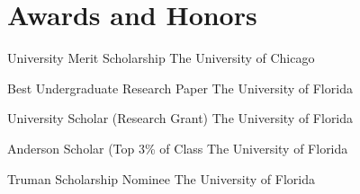 \documentclass[fontsize=8pt]{ChaseCV}
\begin{document}
\section{Awards and Honors}

\begin{factlist}

\item{University Merit Scholarship}
     {The University of Chicago}

\item{Best Undergraduate Research Paper}
     {The University of Florida}
     
\item{University Scholar (Research Grant)}
     {The University of Florida}

\item{Anderson Scholar (Top 3\% of Class}
	{The University of Florida}
	
\item{Truman Scholarship Nominee}
	{The University of Florida}	

\end{factlist}
\end{document}
